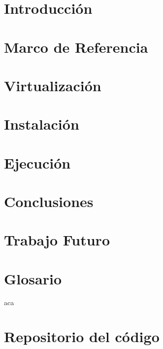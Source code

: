 \documentclass[twoside,letterpaper,12pt]{report}
\begin{document}
\newpage
{}

\chapter{Introducción}


\chapter{Marco de Referencia}\label{ChapRef}


\chapter{Virtualización}


\chapter{Instalación}


\chapter{Ejecución}


\chapter{Conclusiones}


\chapter{Trabajo Futuro}


\chapter{Glosario} \label{chapGlosario}



\newpage



	
	aca
	\cite{czarnecki2000generative}
	\cite{wwwBoost}
	\cite{stroustrup2013c++}
	\cite{andrei2001modern}
	\cite{Wall2000}
	\cite{Boost}
	\cite{Karniadakis}
	\cite{Kernighan1988}

\newpage

\appendix
\chapter{Repositorio del código}

\end{document}

